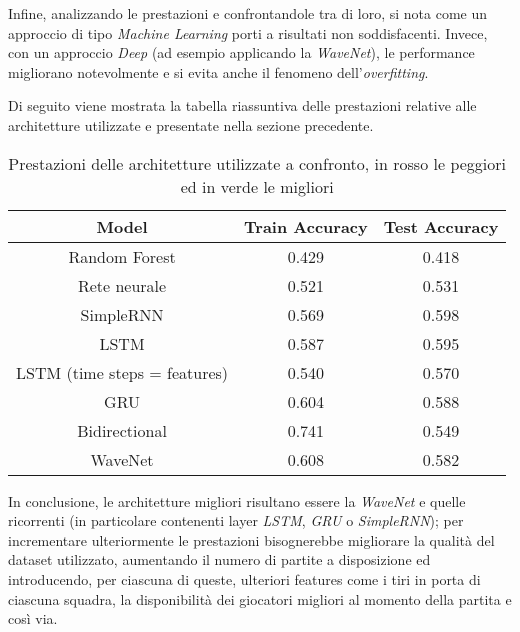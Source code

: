 Infine, analizzando le prestazioni e confrontandole tra di loro, si nota come un approccio di tipo \textit{Machine Learning} porti a risultati non soddisfacenti. Invece, con un approccio \textit{Deep} (ad esempio applicando la \textit{WaveNet}), le performance migliorano notevolmente e si evita anche il fenomeno dell'\textit{overfitting}. 

Di seguito viene mostrata la tabella riassuntiva delle prestazioni relative alle architetture utilizzate e presentate nella sezione precedente.
\begin{table}[h]
    \centering
    \begin{tabular}{|c|c|c|}
    \hline
         \textbf{Model} & \textbf{Train Accuracy} & \textbf{Test Accuracy} \\
    \hline 
        \rowcolor{maroon!70} Random Forest & 0.429 &  0.418 \\
    \hline
        Rete neurale & 0.521 & 0.531 \\
    \hline
        \rowcolor{gre!50} SimpleRNN & 0.569 & 0.598 \\
    \hline
        \rowcolor{gre!50} LSTM & 0.587 & 0.595 \\
    \hline
        LSTM (time steps = features) & 0.540 & 0.570 \\
    \hline
        GRU & 0.604 & 0.588 \\
    \hline
        \rowcolor{maroon!70} Bidirectional & 0.741 & 0.549 \\
    \hline
        WaveNet & 0.608 & 0.582 \\
    \hline
    \end{tabular}
    \caption{Prestazioni delle architetture utilizzate a confronto, in rosso le peggiori ed in verde le migliori}
    \label{tab:prestazioni}
\end{table}

In conclusione, le architetture migliori risultano essere la \textit{WaveNet} e quelle ricorrenti (in particolare contenenti layer \textit{LSTM}, \textit{GRU} o \textit{SimpleRNN}); per incrementare ulteriormente le prestazioni bisognerebbe migliorare la qualità del dataset utilizzato, aumentando il numero di partite a disposizione ed introducendo, per ciascuna di queste, ulteriori features come i tiri in porta di ciascuna squadra, la disponibilità dei giocatori migliori al momento della partita e così via.